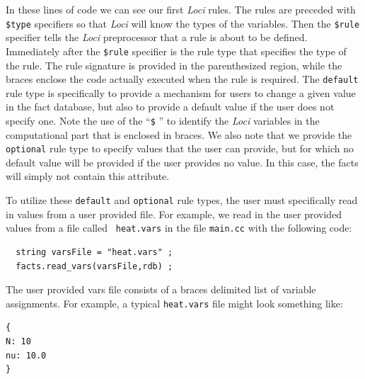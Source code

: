 \documentclass[10pt,epsf,letterpaper,twoside]{book}
\begin{document}
In these lines of code we can see our first {\it Loci} rules.  The rules are
preceded with {\tt \$type} specifiers so that {\it Loci} will know the types
of the variables.  Then the {\tt \$rule} specifier tells the {\it Loci}
preprocessor that a rule is about to be defined.  Immediately after
the {\tt \$rule} specifier is the rule type that specifies the type of
the rule.  The rule signature is provided in the parenthesized region,
while the braces enclose the code actually executed when the rule is
required.  The {\tt default} rule type is specifically to provide a
mechanism for users to change a given value in the fact database, but
also to provide a default value if the user does not specify one.
Note the use of the ``{\tt \$} '' to identify the {\it Loci} variables in
the computational part that is enclosed in braces.  We also note that
we provide the {\tt optional} rule type to specify values that the
user can provide, but for which no default value will be provided if
the user provides no value.  In this case, the facts will simply not
contain this attribute. 

To utilize these {\tt default} and {\tt optional} rule types, the user
must specifically read in values from a user provided file.  For
example, we read in the user provided values from a file called {\tt
  heat.vars} in the file {\tt main.cc} with the following code:

\begin{verbatim}
  string varsFile = "heat.vars" ;
  facts.read_vars(varsFile,rdb) ;
\end{verbatim}

The user provided vars file consists of a braces delimited list of
variable assignments.  For example, a typical {\tt heat.vars} file
might look something like:
\begin{verbatim}
{
N: 10
nu: 10.0
}
\end{verbatim}
\end{document}
